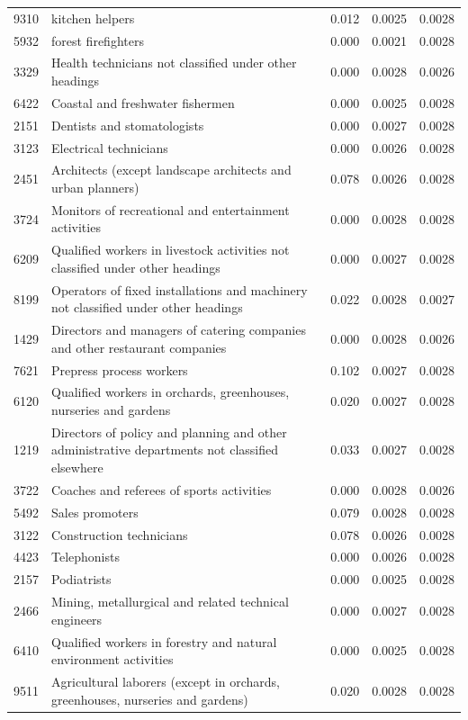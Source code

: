 \begin{longtable}{p{}>{\raggedright\arraybackslash}p{}rrr}
9310 & kitchen helpers & 0.012 & 0.0025 & 0.0028 \\
5932 & forest firefighters & 0.000 & 0.0021 & 0.0028 \\
3329 & Health technicians not classified under other headings & 0.000 & 0.0028 & 0.0026 \\
6422 & Coastal and freshwater fishermen & 0.000 & 0.0025 & 0.0028 \\
2151 & Dentists and stomatologists & 0.000 & 0.0027 & 0.0028 \\
3123 & Electrical technicians & 0.000 & 0.0026 & 0.0028 \\
2451 & Architects (except landscape architects and urban planners) & 0.078 & 0.0026 & 0.0028 \\
3724 & Monitors of recreational and entertainment activities & 0.000 & 0.0028 & 0.0028 \\
6209 & Qualified workers in livestock activities not classified under other headings & 0.000 & 0.0027 & 0.0028 \\
8199 & Operators of fixed installations and machinery not classified under other headings & 0.022 & 0.0028 & 0.0027 \\
1429 & Directors and managers of catering companies and other restaurant companies & 0.000 & 0.0028 & 0.0026 \\
7621 & Prepress process workers & 0.102 & 0.0027 & 0.0028 \\
6120 & Qualified workers in orchards, greenhouses, nurseries and gardens & 0.020 & 0.0027 & 0.0028 \\
1219 & Directors of policy and planning and other administrative departments not classified elsewhere & 0.033 & 0.0027 & 0.0028 \\
3722 & Coaches and referees of sports activities & 0.000 & 0.0028 & 0.0026 \\
5492 & Sales promoters & 0.079 & 0.0028 & 0.0028 \\
3122 & Construction technicians & 0.078 & 0.0026 & 0.0028 \\
4423 & Telephonists & 0.000 & 0.0026 & 0.0028 \\
2157 & Podiatrists & 0.000 & 0.0025 & 0.0028 \\
2466 & Mining, metallurgical and related technical engineers & 0.000 & 0.0027 & 0.0028 \\
6410 & Qualified workers in forestry and natural environment activities & 0.000 & 0.0025 & 0.0028 \\
9511 & Agricultural laborers (except in orchards, greenhouses, nurseries and gardens) & 0.020 & 0.0028 & 0.0028 \\

\end{longtable}
